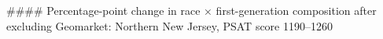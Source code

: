 #### Percentage-point change in race × first-generation composition after excluding Geomarket: Northern New Jersey, PSAT score 1190–1260

